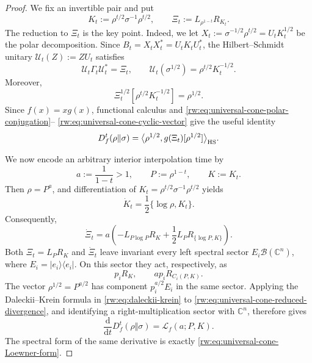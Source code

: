\documentclass[11pt]{article}
\theoremstyle{remark}
\newcommand{\1}{\mathbbm{1}}
\begin{document}
\begin{proof}
We fix an invertible pair and put
\begin{equation}
 K_t:=\rho^{t/2}\sigma^{-1}\rho^{t/2},
 \qquad
 \Xi_t:=L_{\rho^{1-t}}R_{K_t}.
 \label{rw:eq:universal-cone-Xi}
\end{equation}
The reduction to \(\Xi_t\) is the key point.  Indeed, we let
\(X_t:=\sigma^{-1/2}\rho^{t/2}=U_tK_t^{1/2}\) be the polar
decomposition.  Since
\(B_t=X_tX_t^*=U_tK_tU_t^*\), the Hilbert--Schmidt unitary
\(\mathcal U_t(Z):=ZU_t\) satisfies
\begin{equation}
 \mathcal U_t\Gamma_t\mathcal U_t^*=\Xi_t,
 \qquad
 \mathcal U_t(\sigma^{1/2})
 =\rho^{t/2}K_t^{-1/2}.
 \label{rw:eq:universal-cone-polar-conjugation}
\end{equation}
Moreover,
\begin{equation}
 \Xi_t^{1/2}[\rho^{t/2}K_t^{-1/2}]=\rho^{1/2}.
 \label{rw:eq:universal-cone-cyclic-vector}
\end{equation}
Since \(f(x)=xg(x)\), functional calculus and
\eqref{rw:eq:universal-cone-polar-conjugation}--
\eqref{rw:eq:universal-cone-cyclic-vector} give the useful identity
\begin{equation}
 D_f^t(\rho\Vert\sigma)
 =\big\langle\rho^{1/2},
 g(\Xi_t)[\rho^{1/2}]\big\rangle_{\rm HS}.
 \label{rw:eq:universal-cone-reduced-divergence}
\end{equation}

We now encode an arbitrary interior interpolation time by
\begin{equation}
 a:=\frac1{1-t}>1,
 \qquad
 P:=\rho^{1-t},
 \qquad
 K:=K_t.
 \label{rw:eq:universal-cone-time-reparametrization}
\end{equation}
Then \(\rho=P^a\), and differentiation of
\(K_t=\rho^{t/2}\sigma^{-1}\rho^{t/2}\) yields
\begin{equation}
 \dot K_t=\frac12\{\log\rho,K_t\}.
 \label{rw:eq:universal-cone-K-derivative}
\end{equation}
Consequently,
\begin{equation}
 \dot\Xi_t
 =a\left(-L_{P\log P}R_K
 +\frac12L_PR_{\{\log P,K\}}\right).
 \label{rw:eq:universal-cone-Xi-derivative}
\end{equation}
Both \(\Xi_t=L_PR_K\) and \(\dot\Xi_t\) leave invariant every
left spectral sector \(E_i\mathcal B(\mathbb C^n)\), where
\(E_i=|e_i\rangle\langle e_i|\).  On this sector they act,
respectively, as
\begin{equation}
 p_iR_K,
 \qquad
 ap_iR_{C_i(P,K)}.
 \label{rw:eq:universal-cone-sector-actions}
\end{equation}
The vector \(\rho^{1/2}=P^{a/2}\) has component
\(p_i^{a/2}E_i\) in the same sector.  Applying the
Daleckii--Krein formula in \eqref{rw:eq:daleckii-krein} to
\eqref{rw:eq:universal-cone-reduced-divergence}, and identifying a
right-multiplication sector with \(\mathbb C^n\), therefore gives
\begin{equation}
 \frac{\mathrm d}{\mathrm dt}D_f^t(\rho\Vert\sigma)
 =\mathcal L_f(a;P,K).
 \label{rw:eq:universal-cone-derivative-reduction}
\end{equation}
The spectral form of the same derivative is exactly
\eqref{rw:eq:universal-cone-Loewner-form}.


\end{proof}
\end{document}
